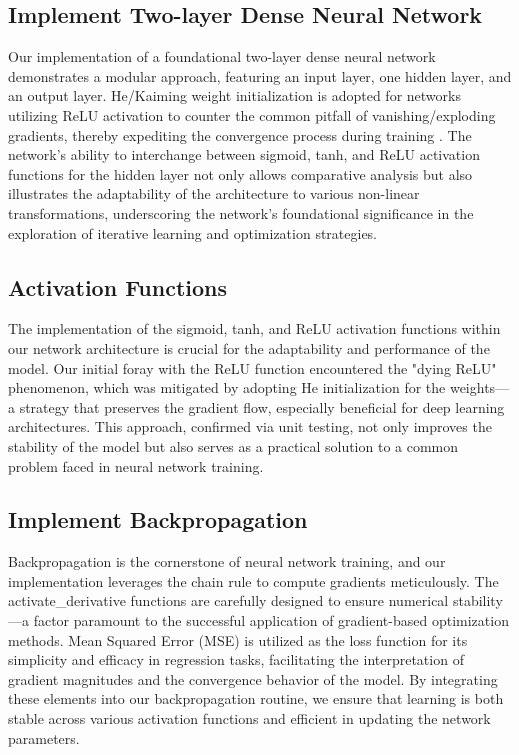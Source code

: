 \documentclass[letterpaper]{article}
\begin{document}
\subsection{Implement Two-layer Dense Neural Network}
\label{subsec:twolayerdense}
Our implementation of a foundational two-layer dense neural network demonstrates a modular approach, featuring an input layer, one hidden layer, and an output layer. He/Kaiming weight initialization is adopted for networks utilizing ReLU activation to counter the common pitfall of vanishing/exploding gradients, thereby expediting the convergence process during training \cite{he2015delving}. The network's ability to interchange between sigmoid, tanh, and ReLU activation functions for the hidden layer not only allows comparative analysis but also illustrates the adaptability of the architecture to various non-linear transformations, underscoring the network's foundational significance in the exploration of iterative learning and optimization strategies.

\subsection{Activation Functions}
\label{subsec:activationfunctions}
The implementation of the sigmoid, tanh, and ReLU activation functions within our network architecture is crucial for the adaptability and performance of the model. Our initial foray with the ReLU function encountered the "dying ReLU" phenomenon, which was mitigated by adopting He initialization for the weights—a strategy that preserves the gradient flow, especially beneficial for deep learning architectures. This approach, confirmed via unit testing, not only improves the stability of the model but also serves as a practical solution to a common problem faced in neural network training.

\subsection{Implement Backpropagation}
\label{subsec:backpropagation}
Backpropagation is the cornerstone of neural network training, and our implementation leverages the chain rule to compute gradients meticulously. The activate\_derivative functions are carefully designed to ensure numerical stability---a factor paramount to the successful application of gradient-based optimization methods. Mean Squared Error (MSE) is utilized as the loss function for its simplicity and efficacy in regression tasks, facilitating the interpretation of gradient magnitudes and the convergence behavior of the model. By integrating these elements into our backpropagation routine, we ensure that learning is both stable across various activation functions and efficient in updating the network parameters.
\end{document}
